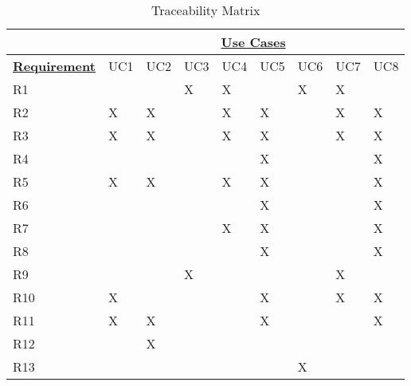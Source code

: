 \usepackage[normalem]{ulem}
\useunder{\uline}{\ul}{}

\begin{table}[]
	\centering
	\caption{Traceability Matrix}
	\begin{tabular}{l|l|l|l|l|l|l|l|l|}
		\cline{2-9}
		                                                 & \multicolumn{8}{c|}{{\ul \textbf{Use Cases}}} \\ \hline
		\multicolumn{1}{|l|}{{\ul \textbf{Requirement}}} & UC1 & UC2 & UC3 & UC4 & UC5 & UC6 & UC7 & UC8 \\ \hline
		\multicolumn{1}{|l|}{R1}                         &     &     & X   & X   &     & X   & X   &     \\ \hline
		\multicolumn{1}{|l|}{R2}                         & X   & X   &     & X   & X   &     & X   & X   \\ \hline
		\multicolumn{1}{|l|}{R3}                         & X   & X   &     & X   & X   &     & X   & X   \\ \hline
		\multicolumn{1}{|l|}{R4}                         &     &     &     &     & X   &     &     & X   \\ \hline
		\multicolumn{1}{|l|}{R5}                         & X   & X   &     & X   & X   &     &     & X   \\ \hline
		\multicolumn{1}{|l|}{R6}                         &     &     &     &     & X   &     &     & X   \\ \hline
		\multicolumn{1}{|l|}{R7}                         &     &     &     & X   & X   &     &     & X   \\ \hline
		\multicolumn{1}{|l|}{R8}                         &     &     &     &     & X   &     &     & X   \\ \hline
		\multicolumn{1}{|l|}{R9}                         &     &     & X   &     &     &     & X   &     \\ \hline
		\multicolumn{1}{|l|}{R10}                        & X   &     &     &     & X   &     & X   & X   \\ \hline
		\multicolumn{1}{|l|}{R11}                        & X   & X   &     &     & X   &     &     & X   \\ \hline
		\multicolumn{1}{|l|}{R12}                        &     & X   &     &     &     &     &     &     \\ \hline
		\multicolumn{1}{|l|}{R13}                        &     &     &     &     &     & X   &     &     \\ \hline
	\end{tabular}
\end{table}